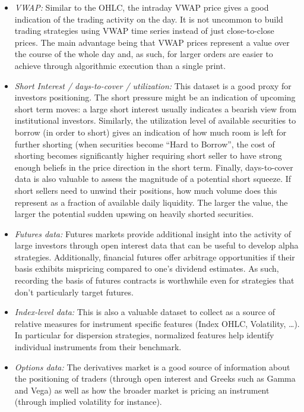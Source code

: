 \begin{itemize}
\item \emph{VWAP:} Similar to the OHLC, the intraday VWAP price gives a good indication of the trading activity on the day. It is not uncommon to build trading strategies using VWAP time series instead of just close-to-close prices. The main advantage being that VWAP prices represent a value over the course of the whole day and, as such, for larger orders are easier to achieve through algorithmic execution than a single print.


\item \emph{Short Interest / days-to-cover / utilization:} This dataset is a good proxy for investors positioning. The short pressure might be an indication of upcoming short term moves: a large short interest usually indicates a bearish view from institutional investors. Similarly, the utilization level of available securities to borrow (in order to short) gives an indication of how much room is left for further shorting (when securities become ``Hard to Borrow'', the cost of shorting becomes significantly higher requiring short seller to have strong enough beliefs in the price direction in the short term. Finally, days-to-cover data is also valuable to assess the magnitude of a potential short squeeze. If short sellers need to unwind their positions, how much volume does this represent as a fraction of available daily liquidity. The larger the value, the larger the potential sudden upswing on heavily shorted securities.


\item \emph{Futures data:} Futures markets provide additional insight into the activity of large investors through open interest data that can be useful to develop alpha strategies. Additionally, financial futures offer arbitrage opportunities if their basis exhibits mispricing compared to one's dividend estimates. As such, recording the basis of futures contracts is worthwhile even for strategies that don't particularly target futures.


\item \emph{Index-level data:} This is also a valuable dataset to collect as a source of relative measures for instrument specific features (Index OHLC, Volatility, \dots). In particular for dispersion strategies, normalized features help identify individual instruments from their benchmark. 


\item \emph{Options data:} The derivatives market is a good source of information about the positioning of traders (through open interest and Greeks such as Gamma and Vega) as well as how the broader market is pricing an instrument (through implied volatility for instance).



\end{itemize}
